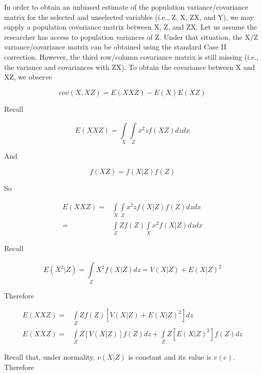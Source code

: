\documentclass[man, babel,english]{apa}%
\begin{document}
In order to obtain an unbiased estimate of the population variance/covariance matrix for the selected and unselected variables (i.e., Z, X, ZX, and Y), we may supply a population covariance matrix between X, Z, and ZX.  Let us assume the researcher has access to population variances of Z. Under that situation, the X/Z variance/covariance matrix can be obtained using the standard Case II correction. However, the third row/column covariance matrix is still missing (i.e., the variance and covariances with ZX). To obtain the covariance between X and XZ, we observe

\begin{equation}
cov(X,XZ) = E(XXZ) - E(X)E(XZ)
\label{eq1}
\end{equation}
 
 Recall 
 \newcommand{\Int}{\int\limits}
 
 \begin{equation}
 \nonumber E(XXZ) =\Int_{X}^{} \Int_{Z}^{} x^2zf(XZ)dzdx
 \end{equation}

And 

\begin{equation}
 \nonumber f(XZ) = f(X|Z)f(Z)
\end{equation}

So 

\begin{align}
 \nonumber E(XXZ) =& \Int_{X}^{} \Int_{Z}^{} x^2zf(X|Z)f(Z)dzdx \\
=& \Int_{Z}^{} Zf(Z) \Int_{X}^{} x^2f(X|Z)dzdx 
\end{align}

Recall

\begin{equation}
 \nonumber E(X^2|Z) = \Int_{Z}^{}X^2f(X|Z)dz = V(X|Z) + E(X|Z)^2
\end{equation}

Therefore

\begin{align}
 \nonumber E(XXZ) =& \Int_{Z}^{} Zf(Z)[V(X|Z) + E(X|Z)^2] dz \\
 \nonumber E(XXZ) =& \Int_{Z}^{} Z[V(X|Z)]f(Z)dz + \Int_{Z}^{}Z[E(X|Z)^2]f(Z) dz
\end{align}

Recall that, under normality, $v(X|Z)$ is constant and its value is $v(e)$. Therefore
\end{document}
